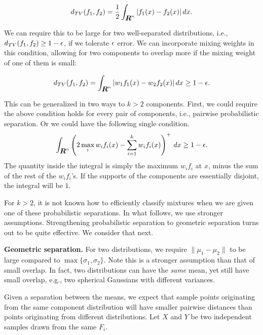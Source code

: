 \documentclass{book}
\numberwithin{exercise}{chapter}
\begin{document}
\[
d_{TV}(f_1,f_2) = \frac{1}{2}\int_{\mbox{\mbox{\boldmath $R$}}^n} |f_1(x)-f_2(x)|\, dx.
\]

We can require this to be large for two well-separated distributions, i.e.,
$d_{TV}(f_1,f_2) \ge 1-\epsilon$, if we tolerate $\epsilon$ error. We can incorporate
mixing weights in this condition, allowing for two components to overlap more if the mixing weight of one of them is small:

\[
d_{TV}(f_1, f_2) = \int_{\mbox{\mbox{\boldmath $R$}}^n} |w_1f_1(x)- w_2f_2(x)| \, dx \ge 1-\epsilon.
\]

This can be generalized in two ways to $k > 2$ components. First, we could require the above condition holds for every pair of components, i.e., pairwise probabilistic separation. Or we could have the following single condition.
\begin{equation}\label{k-TV}
\int_{\mbox{\mbox{\boldmath $R$}}^n} \left(2\max_i w_if_i(x)- \sum_{i=1}^k w_if_i(x)\right)^+ \, dx \ge 1-\epsilon.
\end{equation}
The quantity inside the integral is simply the maximum $w_if_i$ at $x$,
minus the sum of the rest of the $w_if_i$'s. If the supports of the components are essentially disjoint, the integral will be $1$.

For $k > 2$, it is not known how to efficiently classify mixtures when we are given one of these probabilistic separations.  In what follows, we use stronger assumptions. Strengthening probabilistic separation to geometric separation turns out to be quite effective. We consider that
next.

{\bf Geometric separation. }
For two distributions, we require $\|\mu_1-\mu_2\|$ to be large compared to
$\max\{\sigma_1,\sigma_2\}$.
Note this is a
stronger assumption than that of small overlap.  In fact, two
distributions can have the \emph{same} mean, yet still have small
overlap, e.g., two spherical Gaussians with different variances.


Given a separation between the means, we expect that sample points
originating from the same component distribution will have smaller
pairwise distances than points originating from different
distributions. Let $X$ and $Y$ be two independent samples drawn from the
same $F_i$.
\end{document}

